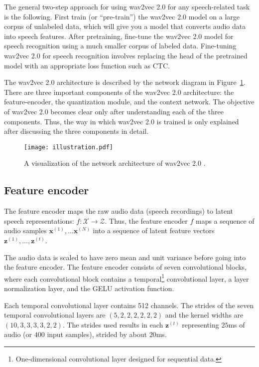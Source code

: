 The general two-step approach for using wav2vec 2.0 for any speech-related task is the following.
First train (or ``pre-train'') the wav2vec 2.0 model on a large corpus of unlabeled data, which
will give you a model that converts audio data into speech features.
After pretraining, fine-tune the wav2vec 2.0 model for speech recognition using a much smaller corpus of labeled data. 
Fine-tuning wav2vec 2.0 for speech recognition involves replacing the head of the pretrained model with
an appropriate loss function such as CTC.

The wav2vec 2.0 architecture is described by the network diagram in Figure~\ref{wav2vec2_architecture}.
There are three important components of the wav2vec 2.0 architecture:
the feature-encoder, the quantization module, and the context network.
The objective of wav2vec 2.0 becomes clear only after understanding each of the three
components. Thus, the way in which wav2vec 2.0 is trained is only explained after discussing
the three components in detail.

\begin{figure}
    \centering
    \captionsetup{justification=centering}
    \texttt{[image: illustration.pdf]}
    \caption{A visualization of the network architecture of wav2vec 2.0 \cite{baevski2020wav2vec}.}
    \label{wav2vec2_architecture}
\end{figure}



\subsection{Feature encoder}
The feature encoder maps the raw audio data (speech recordings) to latent speech representations: $f: \mathcal{X} \rightarrow \mathcal{Z}$.
Thus, the feature encoder $f$ maps a sequence of audio samples $\mathbf{x}^{(1)}, \dots \mathbf{x}^{(N)}$ into a sequence of latent feature vectors $\mathbf{z}^{(1)}, \dots, \mathbf{z}^{(t)}$.

The audio data is scaled to have zero mean and unit variance before going into the feature encoder. 
The feature encoder consists of seven convolutional blocks, where each convolutional block contains a temporal\footnote{One-dimensional convolutional layer designed for sequential data.} convolutional layer, 
a layer normalization layer, and the GELU activation function.

Each temporal convolutional layer contains 512 channels. 
The strides of the seven temporal convolutional layers are $(5,2,2,2,2,2,2)$ and the kernel widths are $(10,3,3,3,3,2,2)$.
The strides used results in each $\mathbf{z}^{(t)}$ representing $25$ms of audio (or $400$ input samples),
strided by about $20$ms.

